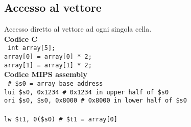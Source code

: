 \documentclass[../main.tex]{subfiles}
\begin{document}
\subsection{Accesso al vettore}
Accesso diretto al vettore ad ogni singola cella.
\\[5mm]
\textbf{Codice C} \\
\texttt{
    int array[5]; \\
    array[0] = array[0] * 2; \\
    array[1] = array[1] * 2; \\[3mm]
}
\textbf{Codice MIPS assembly} \\
\texttt{
    \# \$s0 = array base address \\
    \hspace*{0cm} \hspace*{0cm} lui \$s0, 0x1234 \hspace*{0cm} \hspace*{0cm} \hspace*{0cm} \hspace*{0cm} \hspace*{0cm} \hspace*{0cm} \hspace*{0cm} \hspace*{0cm} \hspace*{0cm} \hspace*{0cm} \hspace*{0cm} \hspace*{0cm} \# 0x1234 in upper half of \$s0 \\
    \hspace*{0cm} \hspace*{0cm} ori \$s0, \$s0, 0x8000 \hspace*{0cm} \hspace*{0cm} \hspace*{0cm} \hspace*{0cm} \hspace*{0cm} \hspace*{0cm} \hspace*{0cm} \# 0x8000 in lower half of \$s0 \\
    \\
    \hspace*{0cm} \hspace*{0cm} lw \$t1, 0(\$s0) \hspace*{0cm} \hspace*{0cm} \hspace*{0cm} \hspace*{0cm} \hspace*{0cm} \hspace*{0cm} \hspace*{0cm} \hspace*{0cm} \hspace*{0cm} \hspace*{0cm} \hspace*{0cm} \hspace*{0cm} \hspace*{0cm} \# \$t1 = array[0] \\
}
\end{document}
